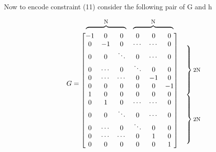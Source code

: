 \documentclass[12pt,twoside,notitlepage]{report}
\begin{document}
Now to encode constraint (11) consider the following pair of G and h

\[G =
\begin{matrix} %
    \begin{matrix}   %
      \overbrace{\hphantom{\begin{matrix}-1 & \cdots & -1\end{matrix}}}^{\text{\footnotesize N}}
                                  &
      \overbrace{
        \hphantom{\begin{matrix}-1 & \cdots & -1\end{matrix}}
      }^{\text{\footnotesize N}}
    \end{matrix}
    &
  \\
\begin{bmatrix}
 -1 & 0 & 0 & 0 & 0 & 0\\
  0 & -1 & 0 & \cdots & \cdots & 0\\
  0 & 0 & \ddots  & 0 & \cdots & 0\\
  0 & \cdots & 0 & \ddots & 0 & 0\\
  0 & \cdots & \cdots & 0 & -1 & 0\\
  0 & 0 & 0 & 0 & 0 & -1 \\
  1 & 0 & 0 & 0 & 0 & 0\\
  0 & 1 & 0 & \cdots & \cdots & 0\\
  0 & 0 & \ddots  & 0 & \cdots & 0\\
  0 & \cdots & 0 & \ddots & 0 & 0\\
  0 & \cdots & \cdots & 0 & 1 & 0\\
  0 & 0 & 0 & 0 & 0 & 1 \\
\end{bmatrix}
  &
    \begin{matrix}    %
      \vphantom{0} \\ %
        \left.\vphantom{\begin{matrix} 0 \\ 0 \\ 0 \\ 0 \\ 0 \\ 0 \\\end{matrix}}\right\}
      \text{\footnotesize 2N} \\
        \left.\vphantom{\begin{matrix} 0 \\ 0 \\ 0 \\ 0 \\ 0 \\ 0 \end{matrix}}\right\}
      \text{\footnotesize 2N} 
    \end{matrix}
    \mspace{-33mu}
\end{matrix}
\]
\end{document}
